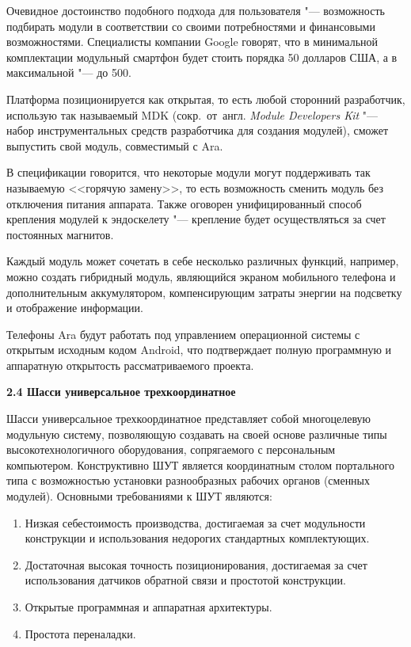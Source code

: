 Очевидное достоинство подобного подхода для пользователя "--- возможность подбирать модули в соответствии со своими потребностями и финансовыми возможностями. Специалисты компании Google говорят, что в минимальной комплектации модульный смартфон будет стоить порядка 50 долларов США, а в максимальной "--- до 500.

Платформа позиционируется как открытая, то есть любой сторонний разработчик, использую так называемый MDK (сокр.~от~англ. \textit{Module Developers Kit} "--- набор инструментальных средств разработчика для создания модулей), сможет выпустить свой модуль, совместимый с Ara.

В спецификации говорится, что некоторые модули могут поддерживать так называемую <<горячую замену>>, то есть возможность сменить модуль без отключения питания аппарата. Также оговорен унифицированный способ крепления модулей к эндоскелету "--- крепление будет осуществляться за счет постоянных магнитов.

Каждый модуль может сочетать в себе несколько различных функций, например, можно создать гибридный модуль, являющийся экраном мобильного телефона и дополнительным аккумулятором, компенсирующим затраты энергии на подсветку и отображение информации.

Телефоны Ara будут работать под управлением операционной системы с открытым исходным кодом Android, что подтверждает полную программную и аппаратную открытость рассматриваемого проекта.

\textbf{2.4 Шасси универсальное трехкоординатное}

Шасси универсальное трехкоординатное представляет собой многоцелевую модульную систему, позволяющую создавать на своей основе различные типы высокотехнологичного оборудования, сопрягаемого с персональным компьютером. Конструктивно ШУТ является координатным столом портального типа с возможностью установки разнообразных рабочих органов (сменных модулей). Основными требованиями к ШУТ являются:

\begin{enumerate}
	\item Низкая себестоимость производства, достигаемая за счет модульности конструкции и использования недорогих стандартных комплектующих.
	
	\item Достаточная высокая точность позиционирования, достигаемая за счет использования датчиков обратной связи и простотой конструкции.
	
	\item Открытые программная и аппаратная архитектуры.
	
	\item Простота переналадки.
\end{enumerate}

